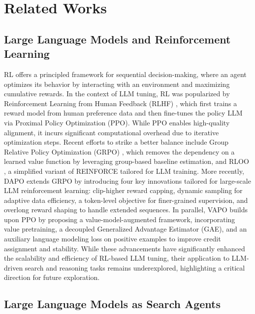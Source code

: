 \section{Related Works}

\subsection{Large Language Models and Reinforcement Learning}

RL \citep{kaelbling1996reinforcement, sutton1999reinforcement} offers a principled framework for sequential decision-making, where an agent optimizes its behavior by interacting with an environment and maximizing cumulative rewards. 
In the context of LLM tuning, RL was popularized by Reinforcement Learning from Human Feedback (RLHF) \citep{jin2025llm, kaufmann2023survey, ouyang2022training}, which first trains a reward model from human preference data \citep{lambert2024rewardbench} and then fine-tunes the policy LLM via Proximal Policy Optimization (PPO).
While PPO enables high-quality alignment, it incurs significant computational overhead due to iterative optimization steps.
Recent efforts to strike a better balance include Group Relative Policy Optimization (GRPO) \citep{shao2024deepseekmath}, which removes the dependency on a learned value function by leveraging group-based baseline estimation, and RLOO \citep{ahmadian2024back}, a simplified variant of REINFORCE \citep{williams1992simple} tailored for LLM training. 
More recently, DAPO \citep{yu2025dapo} extends GRPO by introducing four key innovations tailored for large-scale LLM reinforcement learning: clip-higher reward capping, dynamic sampling for adaptive data efficiency, a token-level objective for finer-grained supervision, and overlong reward shaping to handle extended sequences. 
In parallel, VAPO \citep{yuan2025vapo} builds upon PPO by proposing a value-model-augmented framework, incorporating value pretraining, a decoupled Generalized Advantage Estimator (GAE), and an auxiliary language modeling loss on positive examples to improve credit assignment and stability. 
While these advancements have significantly enhanced the scalability and efficiency of RL-based LLM tuning, their application to LLM-driven search and reasoning tasks remains underexplored, highlighting a critical direction for future exploration.

\subsection{Large Language Models as Search Agents}

